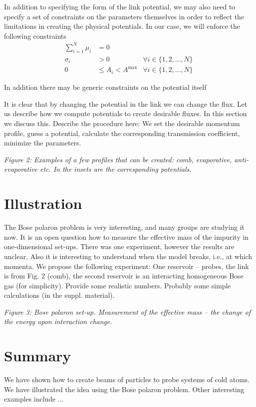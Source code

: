 \documentclass[twocolumn,amsmath,amssymb,showpacs,prl,superscriptaddress,aps]{revtex4-1}
\begin{document}
In addition to specifying the form of the link potential, we may also need to specify a set of constraints on the parameters themselves in order to reflect the limitations in creating the physical potentials. In our case, we will enforce the following constraints
\begin{align}
  \sum_{i=1}^{N}\mu_i &= 0 & \\
  \sigma_i &> 0 &\forall i \in\{1,2,\ldots,N\}\\
  0 &\leq A_i < A^\mathrm{max} &\forall i \in\{1,2,\ldots,N\}             
\end{align}

In addition there may be generic constraints on the potential itself 

 It is clear that by changing the potential in the link we can change the flux. Let us describe how we compute potentials to create desirable fluxes. In this section we discuss this.  Describe the procedure here: We set the desirable momentum profile, guess a potential, calculate the corresponding transmission coefficient, minimize the parameters. 

{\it Figure 2: Examples of a few profiles that can be created: comb, evaporative, anti-evaporative etc. In the insets are the corresponding potentials.}

\section{Illustration}

The Bose polaron problem is very interesting, and many groups are studying it now. It is an open question how to measure the effective mass of the impurity in one-dimensional set-ups. There was one experiment, however the results are unclear. Also it is interesting to understand when the model breaks, i.e., at which momenta. We propose the following experiment: One reservoir -- probes, the link is from Fig. 2 (comb), the second reservoir is an interacting homogeneous Bose gas (for simplicity). Provide some realistic numbers. Probably some simple calculations (in the suppl. material). 

{\it Figure 3: Bose polaron set-up. Measurement of the effective mass -- the change of the energy upon interaction change.}


\section{Summary} 

We have shown how to create beams of particles to probe systems of cold atoms. We have illustrated the idea using the Bose polaron problem. Other interesting examples include ... 
\end{document}

